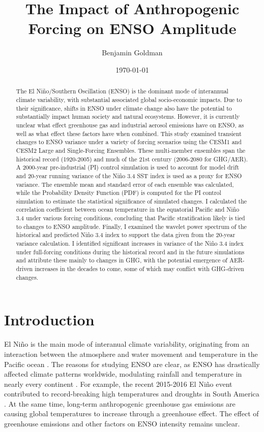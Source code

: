 \documentclass[11pt]{article}
\author{Benjamin Goldman}
\date{\today}
\title{The Impact of Anthropogenic Forcing on ENSO Amplitude}
\begin{document}
\maketitle

\begin{abstract}
The El Niño/Southern Oscillation (ENSO) is the dominant mode of interannual climate variability, with substantial associated global socio-economic impacts. Due to their significance, shifts in ENSO under climate change also have the potential to substantially impact human society and natural ecosystems. However, it is currently unclear what effect greenhouse gas and industrial aerosol emissions have on ENSO, as well as what effect these factors have when combined. This study examined transient changes to ENSO variance under a variety of forcing scenarios using the CESM1 and CESM2 Large and Single-Forcing Ensembles. These multi-member ensembles span the historical record (1920-2005) and much of the 21st century (2006-2080 for GHG/AER). A 2000-year pre-industrial (PI) control simulation is used to account for model drift and 20-year running variance of the Niño 3.4 SST index is used as a proxy for ENSO variance. The ensemble mean and standard error of each ensemble was calculated, while the Probability Density Function (PDF) is computed for the PI control simulation to estimate the statistical significance of simulated changes. I calculated the correlation coefficient between ocean temperature in the equatorial Pacific and Niño 3.4 under various forcing conditions, concluding that Pacific stratification likely is tied to changes to ENSO amplitude. Finally, I examined the wavelet power spectrum of the historical and predicted Niño 3.4 index to support the data given from the 20-year variance calculation. I identified significant increases in variance of the Niño 3.4 index under full-forcing conditions during the historical record and in the future simulations and attribute these mainly to changes in GHG, with the potential emergence of AER-driven increases in the decades to come, some of which may conflict with GHG-driven changes.
\end{abstract}

\section{Introduction}

El Niño is the main mode of interanual climate variability, originating from an interaction between the atmosphere and water movement and temperature in the Pacific ocean \citep{bjerknes1969atmospheric}. The reasons for studying ENSO are clear, as ENSO has drastically affected climate patterns worldwide, modulating rainfall and temperature in nearly every continent \citep{ropelewski1987global}. For example, the recent 2015-2016 El Niño event contributed to record-breaking high temperatures and droughts in South America \citep{jimenez2016record}. At the same time, long-term anthropogenic greenhouse gas emissions are causing global temperatures to increase through a greenhouse effect. The effect of greenhouse emissions and other factors on ENSO intensity remains unclear.
\end{document}
